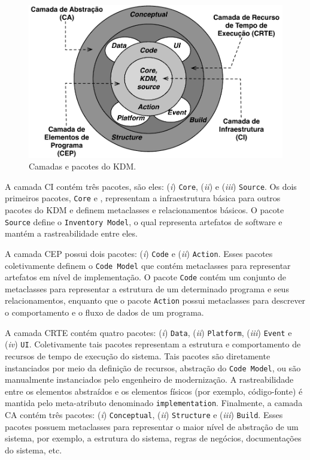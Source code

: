 %
\begin{figure}[htb]
 \caption{Camadas e pacotes do KDM.}
 \label{fig:kdm_layer}
 \centering
 \includegraphics[scale=0.67]{images/kdm_layers.pdf}
\end{figure}
%
A camada CI contém três pacotes, são eles: (\textit{i}) \texttt{Core}, (\textit{ii}) \texttt{} e (\textit{iii}) \texttt{Source}. Os dois primeiros pacotes, \texttt{Core} e \texttt{}, representam a infraestrutura básica para outros pacotes do KDM e definem metaclasses e relacionamentos básicos. O pacote \texttt{Source} define o \texttt{Inventory Model}, o qual representa artefatos de software e mantém a rastreabilidade entre eles. 

A camada CEP possui dois pacotes: (\textit{i}) \texttt{Code} e (\textit{ii}) \texttt{Action}. Esses pacotes coletivamente definem o \texttt{Code Model} que contém metaclasses para representar artefatos em nível de implementação. O pacote \texttt{Code} contém um conjunto de metaclasses para representar a estrutura de um determinado programa e seus relacionamentos, enquanto que o pacote \texttt{Action} possui metaclasses para descrever o comportamento e o fluxo de dados de um programa.

A camada CRTE contém quatro pacotes: (\textit{i}) \texttt{Data}, (\textit{ii}) \texttt{Platform}, (\textit{iii}) \texttt{Event} e (\textit{iv}) \texttt{UI}. Coletivamente tais pacotes representam a estrutura e comportamento de recursos de tempo de execução do sistema. Tais pacotes são diretamente instanciados por meio da definição de recursos, abstração do \texttt{Code Model}, ou são manualmente instanciados pelo engenheiro de modernização. A rastreabilidade entre os elementos abstraídos e os elementos físicos (por exemplo, código-fonte) é mantida pelo meta-atributo denominado \texttt{implementation}. Finalmente, a camada CA contém três pacotes: (\textit{i}) \texttt{Conceptual}, (\textit{ii}) \texttt{Structure} e (\textit{iii}) \texttt{Build}. Esses pacotes possuem metaclasses para representar o maior nível de abstração de um sistema, por exemplo, a estrutura do sistema, regras de negócios, documentações do sistema, etc.

